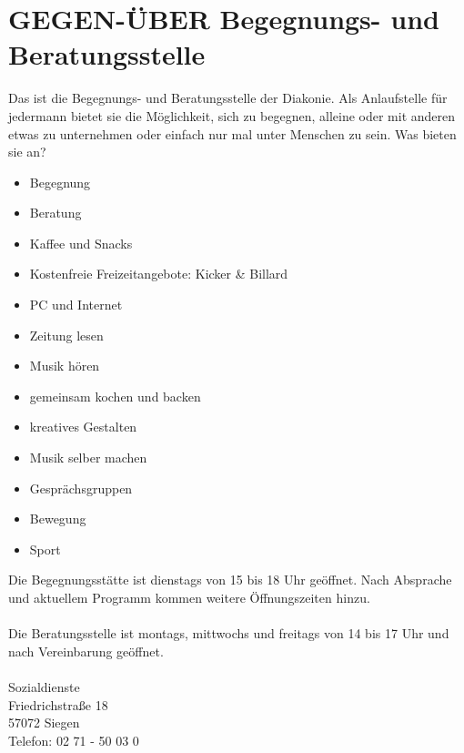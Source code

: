 \documentclass[11pt,fleqn]{book} %
\begin{document}
\section{GEGEN-ÜBER Begegnungs- und Beratungsstelle}
Das ist die Begegnungs- und Beratungsstelle der Diakonie. Als Anlaufstelle für jedermann bietet sie die Möglichkeit, sich zu begegnen, alleine oder mit anderen etwas zu unternehmen oder einfach nur mal unter Menschen zu sein. Was bieten sie an?

\begin{itemize}
	\item Begegnung
	\item Beratung
	\item Kaffee und Snacks
	\item Kostenfreie Freizeitangebote: Kicker \& Billard
	\item PC und Internet
	\item Zeitung lesen
	\item Musik hören
	\item gemeinsam kochen und backen
	\item kreatives Gestalten
	\item Musik selber machen
	\item Gesprächsgruppen
	\item Bewegung
	\item Sport
\end{itemize}

Die Begegnungsstätte ist dienstags von 15 bis 18 Uhr geöffnet. Nach Absprache und aktuellem Programm kommen weitere Öffnungszeiten hinzu.\\
\\
Die Beratungsstelle ist montags, mittwochs und freitags von 14 bis 17 Uhr und nach Vereinbarung geöffnet.\\
\\
Sozialdienste \\
Friedrichstraße 18\\
57072 Siegen\\
Telefon: 02 71 - 50 03 0 \\
\end{document}
